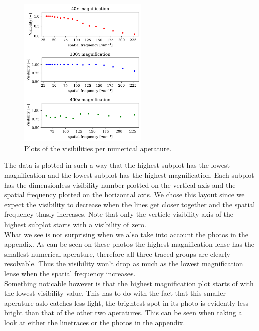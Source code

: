 \begin{figure}
    \centering
    \vspace{-3mm}
    \includegraphics[width=0.55\textwidth,keepaspectratio]{afbeeldingen/visibilities.png}
    \caption{Plots of the visibilities per numerical aperature.}
    \label{fig:visibilities}
    \vspace{0mm}
\end{figure}

\vspace{-7mm}
The data is plotted in such a way that the highest subplot has the lowest magnification and the lowest subplot has the highest magnification. Each subplot has the dimensionless visibility number plotted on the vertical axis and the spatial frequency plotted on the horizontal axis. We chose this layout since we expect the visibility to decrease when the lines get closer together and the spatial frequency thusly increases. Note that only the verticle visibility axis of the highest subplot starts with a visibility of zero.\\
What we see is not surprising when we also take into account the photos in the appendix. As can be seen on these photos the highest magnification lense has the smallest numerical aperature, therefore all three traced groups are clearly resolvable. Thus the visibility won't drop as much as the lowest magnification lense when the spatial frequency increases.\\
Something noticable however is that the highest magnification plot starts of with the lowest visibility value. This has to do with the fact that this smaller aperature aslo catches less light, the brightest spot in its photo is evidently less bright than that of the other two aperatures. This can be seen when taking a look at either the linetraces or the photos in the appendix.


